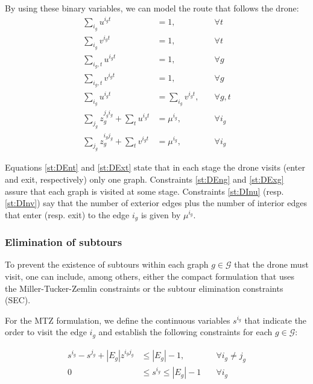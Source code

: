 By using these binary variables, we can model the route that follows the drone:
\begin{align}
    \sum_{i_g} u^{i_gt} & = 1, &\quad\forall t \label{st:DEnt}\\%
    \sum_{i_g} v^{i_gt} & = 1, &\quad\forall t \label{st:DExt}\\%
    \sum_{i_g, t} u^{i_gt} & = 1, &\quad\forall g \label{st:DEng}\\%
    \sum_{i_g, t} v^{i_gt} & = 1, &\quad\forall g \label{st:DExg}\\%
    \sum_{i_g} u^{i_gt} & = \sum_{i_g} v^{i_gt}, &\quad\forall g, t \label{st:Duv}\\%
    \sum_{j_g} z_g^{j_gi_g} + \sum_{t} u^{i_gt} & = \mu^{i_g}, &\quad\forall i_g \label{st:DInu}\\
    \sum_{j_g} z_g^{i_gj_g} + \sum_{t} v^{i_gt} & = \mu^{i_g}, &\quad\forall i_g \label{st:DInv}
\end{align}

Equations \eqref{st:DEnt} and \eqref{st:DExt} state that in each stage the drone visits (enter and exit, respectively) only one graph. Constraints \eqref{st:DEng} and \eqref{st:DExg} assure that each graph is visited at some stage. Constraints \eqref{st:DInu} (resp. \eqref{st:DInv}) say that the number of exterior edges plus the number of interior edges that enter (resp. exit) to the edge $i_g$ is given by $\mu^{i_g}$.

\subsubsection*{Elimination of subtours}
To prevent the existence of subtours within each graph $g\in \mathcal G$ that the drone must visit, one can include, among others, either the compact formulation that uses the Miller-Tucker-Zemlin constraints or the subtour elimination  constraints (SEC).

For the MTZ formulation, we define the continuous variables $s^{i_g}$ that indicate the order to visit the edge $i_g$ and establish the following constraints for each $g\in\mathcal G$:

\begin{align}
    s^{i_g} - s^{j_g} + |E_g|z^{i_gj_g} & \leq |E_g| - 1  , &\quad\forall i_g\neq j_g \tag{MTZ$_1$} \label{MTZ1}\\
    0 & \leq s^{i_g} \leq |E_g| - 1 &\quad\forall i_g\tag{MTZ$_2$}\label{MTZ2}
\end{align}

